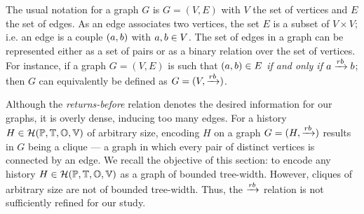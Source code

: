 \documentclass[12pt]{article}
\begin{document}
The usual notation for a graph $G$ is $G=(V,E)$ with $V$ the set of vertices and $E$ the set of edges. As an edge associates two vertices, the set $E$ is a subset of $V\times V$; i.e. an edge is a couple $(a,b)$ with $a,b\in V$. The set of edges in a graph can be represented either as a set of pairs or as a binary relation over the set of vertices. For instance, if a graph $G=(V,E)$ is such that $(a,b)\in E$ \emph{if and only if} $a\xrightarrow{rb}b$; then $G$ can equivalently be defined as $G=(V,\xrightarrow{rb})$.
%
%
%  
%  
%  
%
%


Although the \textsl{returns-before} relation denotes the desired information for our graphs, it is overly dense, inducing too many edges. For a history $H\in\mathcal{H}(\mathbb{P}, \mathbb{T}, \mathbb{O}, \mathbb{V})$ of arbitrary size, encoding $H$ on a graph $G=(H,\xrightarrow{rb})$ results in $G$ being a clique --- a graph in which every pair of distinct vertices is connected by an edge. We recall the objective of this section: to encode any history $H\in\mathcal{H}(\mathbb{P}, \mathbb{T}, \mathbb{O}, \mathbb{V})$ as a graph of bounded tree-width. However, cliques of arbitrary size are not of bounded tree-width. Thus, the $\xrightarrow{rb}$ relation is not sufficiently refined for our study. 
\end{document}
